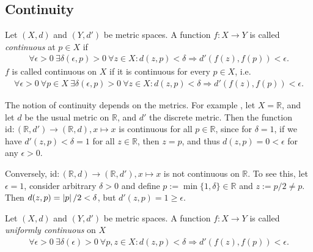 \newpage 
\subsection{Continuity}
\begin{defn}\label{defn:continuity}
	Let $(X, d)$ and $(Y, d')$ be metric spaces. A function $f: X\rightarrow Y$ is called \textit{continuous} at $p\in X$ if 
	\begin{align}
		\forall \epsilon > 0\ \exists \delta(\epsilon, p) > 0\ \forall z\in X: d(z, p) < \delta \Rightarrow d'(f(z), f(p)) < \epsilon.  
	\end{align}
	$f$ is called continuous on $X$ if it is continuous for every $p\in X$, i.e.
	\begin{align}
		\forall \epsilon > 0\ \forall p\in X\ \exists \delta(\epsilon, p) > 0\ \forall z\in X: d(z, p) < \delta \Rightarrow d'(f(z), f(p)) < \epsilon.  
	\end{align}
\end{defn}

\begin{remark}
	The notion of continuity depends on the metrics. For example \cite{2087322}, let $X = \mathbb R$, and let $d$ be the usual metric on $\mathbb R$, and $d'$ the discrete metric. Then the function $\text{id}: (\mathbb R, d') \to (\mathbb R, d), x\mapsto x$ is continuous for all $p\in \mathbb R$, since for $\delta = 1$, if we have $d'(z, p) < \delta = 1$ for all $z\in\mathbb R$, then $z = p$, and thus $d(z, p) = 0 < \epsilon$ for any $\epsilon > 0$.
	
	Conversely, $\text{id}: (\mathbb R, d) \to (\mathbb R, d'), x\mapsto x$ is not continuous on $\mathbb R$. To see this, let $\epsilon = 1$, consider arbitrary $\delta > 0$ and define $p := \min\{1, \delta\}\in\mathbb R$ and $z := p/2\ne p$. Then $d(z, p) = \left\vert p \right\vert/2 < \delta$, but $d'(z, p) = 1 \geq \epsilon$.
\end{remark}

\begin{defn}
	Let $(X, d)$ and $(Y, d')$ be metric spaces. A function $f: X\rightarrow Y$ is called \textit{uniformly continuous} on $X$
	\begin{align}
		\forall\epsilon > 0\ \exists \delta(\epsilon) > 0\ \forall p, z\in X: d(z, p) < \delta \Rightarrow d'(f(z), f(p)) < \epsilon.
	\end{align}
\end{defn}

